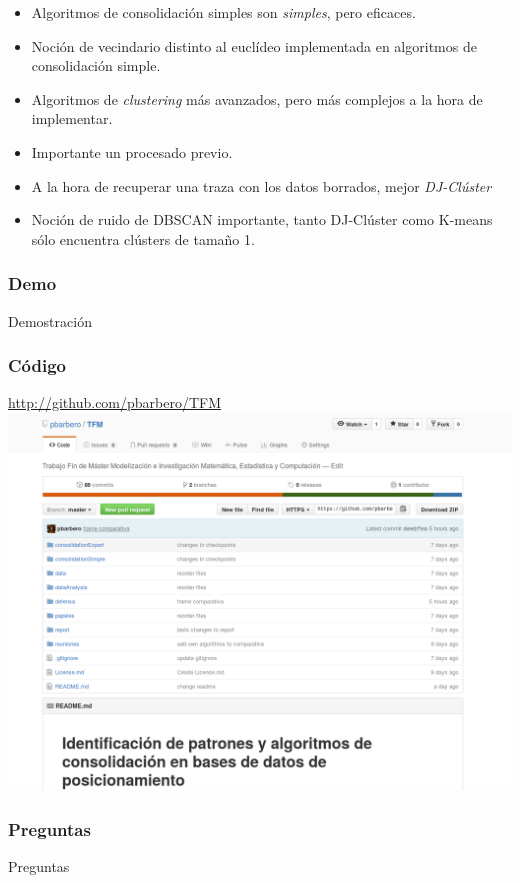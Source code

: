 \documentclass[10pt, spanish]{beamer}
\begin{document}
\begin{frame}[fragile]
\begin{itemize}[<+- | alert@+>]
	\item Algoritmos de consolidaci\'on simples son \textit{simples}, pero eficaces.
	\item Noci\'on de vecindario distinto al eucl\'ideo implementada en algoritmos de consolidaci\'on simple.
	\item Algoritmos de \textit{clustering} m\'as avanzados, pero m\'as complejos a la hora de implementar.
	\item Importante un procesado previo.
	\item A la hora de recuperar una traza con los datos borrados, mejor \textit{DJ-Cl\'uster}
	\item Noci\'on de ruido de DBSCAN importante, tanto DJ-Cl\'uster como K-means s\'olo encuentra cl\'usters de tama\~no 1.
\end{itemize}
\end{frame}


\begin{frame}[fragile]
\frametitle{Demo}
Demostraci\'on
\end{frame}

\begin{frame}[fragile]
	\frametitle{C\'odigo}
	\begin{center}
		\href{http://github.com/pbarbero/TFM}{http://github.com/pbarbero/TFM}
		\includegraphics[scale=.3]{github.png}
	\end{center}
\end{frame}

\begin{frame}[fragile]
\frametitle{Preguntas}
Preguntas
\end{frame}

\end{document}
